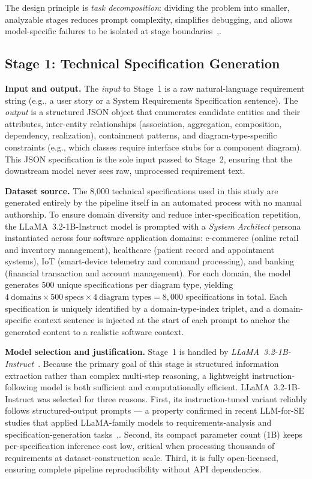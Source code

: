 \documentclass[conference]{IEEEtran}
\begin{document}
The design principle is \textit{task decomposition}: dividing the
problem into smaller, analyzable stages reduces prompt complexity,
simplifies debugging, and allows model-specific failures to be
isolated at stage boundaries~\cite{wei2022},\cite{brown2020}.

\subsection{Stage 1: Technical Specification Generation}

\textbf{Input and output.}
The \textit{input} to Stage~1 is a raw natural-language requirement
string (e.g., a user story or a System Requirements Specification
sentence). The \textit{output} is a structured JSON object that
enumerates candidate entities and their attributes, inter-entity
relationships (association, aggregation, composition, dependency,
realization), containment patterns, and diagram-type-specific
constraints (e.g., which classes require interface stubs for a
component diagram). This JSON specification is the sole input passed
to Stage~2, ensuring that the downstream model never sees raw,
unprocessed requirement text.

\textbf{Dataset source.}
The 8,000 technical specifications used in this study are generated
entirely by the pipeline itself in an automated process with no
manual authorship. To ensure domain diversity and reduce
inter-specification repetition, the LLaMA~3.2-1B-Instruct model is
prompted with a \textit{System Architect} persona instantiated across
four software application domains: e-commerce (online retail and
inventory management), healthcare (patient record and appointment
systems), IoT (smart-device telemetry and command processing), and
banking (financial transaction and account management). For each
domain, the model generates 500 unique specifications per diagram
type, yielding $4~\text{domains} \times 500~\text{specs} \times
4~\text{diagram types} = 8{,}000$ specifications in total. Each
specification is uniquely identified by a domain-type-index triplet,
and a domain-specific context sentence is injected at the start of
each prompt to anchor the generated content to a realistic software
context.

\textbf{Model selection and justification.}
Stage~1 is handled by \textit{LLaMA~3.2-1B-Instruct}~\cite{llama3herd}.
Because the primary goal of this stage is structured information
extraction rather than complex multi-step reasoning, a lightweight
instruction-following model is both sufficient and computationally
efficient. LLaMA~3.2-1B-Instruct was selected for three reasons.
First, its instruction-tuned variant reliably follows
structured-output prompts — a property confirmed in recent
LLM-for-SE studies that applied LLaMA-family models to
requirements-analysis and specification-generation
tasks~\cite{jahan2024},\cite{bates2025}. Second, its compact parameter
count (1B) keeps per-specification inference cost low, critical when
processing thousands of requirements at dataset-construction scale.
Third, it is fully open-licensed, ensuring complete pipeline
reproducibility without API dependencies.
\end{document}
